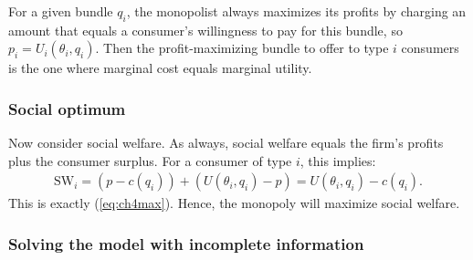 For a given bundle $q_i$, the monopolist always maximizes its profits by
charging an amount that equals a consumer's willingness to pay for this bundle,
so $p_i=U_i(\theta_i,q_i)$. Then the profit-maximizing bundle to offer to type
$i$ consumers is the one where marginal cost equals marginal utility.
\subsubsection{Social optimum}
Now consider social welfare. As always, social welfare equals the firm's
profits plus the consumer surplus. For a consumer of type $i$, this implies:
\begin{align}
	\text{SW}_i=(p-c(q_i))+(U(\theta_i,q_i)-p)=U(\theta_i,q_i)-c(q_i).
\end{align}
This is exactly (\ref{eq:ch4max}). Hence, the monopoly will maximize social
welfare.
\subsubsection{Solving the model with incomplete information}

